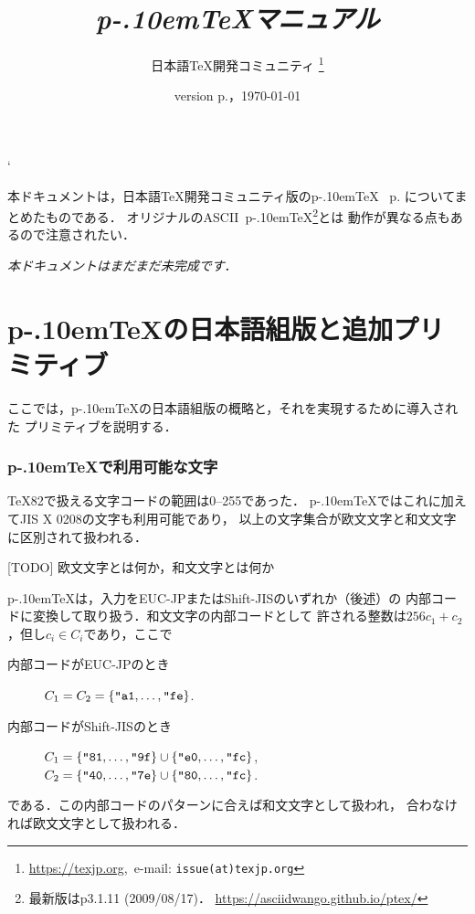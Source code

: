 \documentclass[a4paper,11pt,nomag]{jsarticle}
\def\pTeX{p\kern-.10em\TeX}
\begin{document}
\catcode`
\title{\emph{\pTeX マニュアル}}
\author{日本語\TeX 開発コミュニティ\null
\thanks{\url{https://texjp.org},\ e-mail: \texttt{issue(at)texjp.org}}}
\date{version p\the\ptexversion.\the\ptexminorversion\ptexrevision，\today}
\maketitle

本ドキュメントは，日本語\TeX 開発コミュニティ版の\pTeX%
~p\the\ptexversion.\the\ptexminorversion\ptexrevision
についてまとめたものである．
オリジナルのASCII~\pTeX\footnote{最新版はp3.1.11 (2009/08/17)．
  \url{https://asciidwango.github.io/ptex/}}とは
動作が異なる点もあるので注意されたい．

\emph{\large 本ドキュメントはまだまだ未完成です．}

\tableofcontents

\newpage

\part{\pTeX の日本語組版と追加プリミティブ}

ここでは，\pTeX の日本語組版の概略と，それを実現するために導入された
プリミティブを説明する．

\section{\pTeX で利用可能な文字}
\label{sec:ptexchar}

\TeX82で扱える文字コードの範囲は0--255であった．
\pTeX ではこれに加えてJIS X 0208の文字も利用可能であり，
以上の文字集合が欧文文字と和文文字に区別されて扱われる．

[TODO] 欧文文字とは何か，和文文字とは何か

%

\pTeX は，入力をEUC-JPまたはShift-JISのいずれか（後述）の
内部コードに変換して取り扱う．和文文字の内部コードとして
許される整数は$256c_1+c_2$，但し$c_i\in C_i$であり，ここで
\begin{description}
 \item[内部コードがEUC-JPのとき]
    $C_1=C_2=\{\hex{a1},\dots,\hex{fe}\}$.
 \item[内部コードがShift-JISのとき]
    $C_1=\{\hex{81},\dots,\hex{9f}\}\cup\{\hex{e0},\dots,\hex{fc}\}$,\\
    $C_2=\{\hex{40},\dots,\hex{7e}\}\cup\{\hex{80},\dots,\hex{fc}\}$.
\end{description}
である．この内部コードのパターンに合えば和文文字として扱われ，
合わなければ欧文文字として扱われる．
\end{document}
